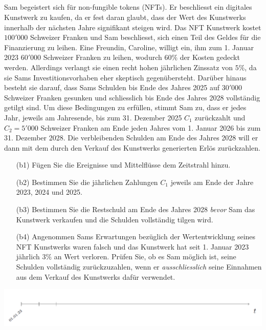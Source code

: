 \subsection*{}
Sam begeistert sich für non-fungible tokens (NFTs).
Er beschliesst ein digitales Kunstwerk zu kaufen, da er fest daran glaubt, dass der Wert des Kunstwerks innerhalb der nächsten Jahre signifikant steigen wird. 
Das NFT Kunstwerk kostet $100'000$ Schweizer Franken und Sam
beschliesst, sich einen Teil des Geldes für die Finanzierung zu leihen.
Eine Freundin, Caroline, willigt ein, ihm zum 1. Januar 2023 $60'000$
Schweizer Franken zu leihen, wodurch $60 \% $ der Kosten gedeckt werden.
Allerdings verlangt sie einen recht hohen jährlichen Zinssatz
von $5 \%$, da sie Sams Investitionsvorhaben eher skeptisch gegenübersteht.
Darüber hinaus besteht sie darauf, dass Sams Schulden bis Ende des Jahres 2025 auf
$30'000$ Schweizer Franken gesunken und schliesslich bis Ende des Jahres 2028 vollständig getilgt sind.
Um diese Bedingungen zu erfüllen, stimmt Sam zu, dass er jedes Jahr, jeweils am Jahresende, bis zum 31. Dezember 2025 $C_1$ zurückzahlt und $C_2 = 5'000$ Schweizer Franken am Ende jeden Jahres vom 1. Januar 2026 bis zum 31. Dezember 2028.
Die verbleibenden Schulden am Ende des Jahres 2028 will er dann mit dem durch den Verkauf des Kunstwerks generierten
Erlös zurückzahlen.
\begin{enumerate}
	\item[(b1)] Fügen Sie die Ereignisse und Mittelflüsse dem Zeitstrahl hinzu.
	\item[(b2)] Bestimmen Sie die jährlichen Zahlungen $C_1$ jeweils am Ende der Jahre 2023, 2024 und 2025.
	\item[(b3)] Bestimmen Sie die Restschuld am Ende des Jahres 2028 \textit{bevor} Sam das Kunstwerk verkaufen und die Schulden vollständig tilgen wird.
	\item[(b4)] Angenommen Sams Erwartungen bezüglich der Wertentwicklung seines NFT Kunstwerks waren falsch und das Kunstwerk hat seit 1. Januar 2023 jährlich $3 \%$ an Wert verloren. Prüfen Sie, ob es Sam möglich ist, seine Schulden vollständig zurückzuzahlen, wenn er \textit{ausschliesslich} seine Einnahmen aus dem Verkauf des Kunstwerks dafür verwendet.
\end{enumerate}
\begin{center}
	\includegraphics[scale=0.45]{pictures/zeitstrahl_1_b}
\end{center}
